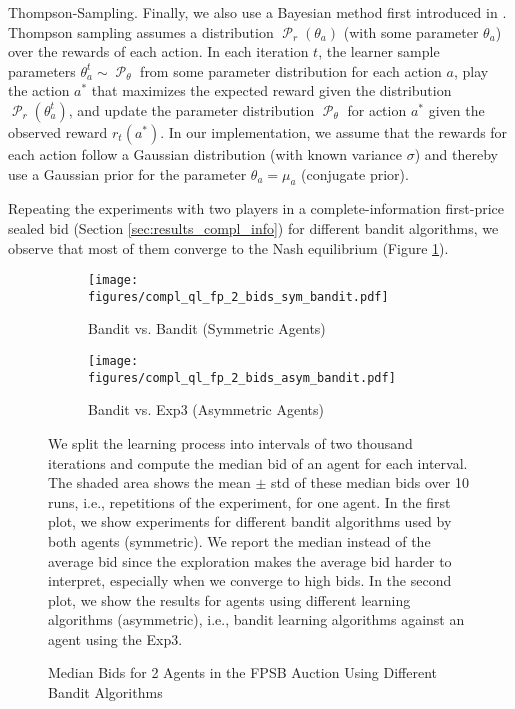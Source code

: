 \documentclass{article}
\DeclareMathOperator{\Pcal}{\mathcal{P}}
\begin{document}
\begin{appendix}
\begin{description}
	\item Thompson-Sampling. Finally, we also use a Bayesian method first introduced in \citep{thompson1933}. Thompson sampling assumes a distribution $\Pcal_r(\theta_a)$ (with some parameter $\theta_a$) over the rewards of each action. In each iteration $t$, the learner sample parameters $\theta_a^t \sim \Pcal_\theta$ from some parameter distribution for each action $a$, play the action $a^*$ that maximizes the expected reward given the distribution $\Pcal_r(\theta_a^t)$, and update the parameter distribution $\Pcal_\theta$ for action $a^*$ given the observed reward $r_t(a^*)$.
	In our implementation, we assume that the rewards for each action follow a Gaussian distribution (with known variance $\sigma$) and thereby use a Gaussian prior for the parameter $\theta_a = \mu_a$ (conjugate prior).
\end{description}
Repeating the experiments with two players in a complete-information first-price sealed bid (Section \ref{sec:results_compl_info}) for different bandit algorithms, we observe that most of them converge to the Nash equilibrium (Figure \ref{fig:bandit}).
\begin{figure}[h]
	\begin{center}
		\begin{subfigure}{0.45\textwidth}
			\centering
			\texttt{[image: figures/compl\_ql\_fp\_2\_bids\_sym\_bandit.pdf]}
			\caption{Bandit vs. Bandit (Symmetric Agents)}
		\end{subfigure}
		\begin{subfigure}{0.45\textwidth}
			\centering
			\texttt{[image: figures/compl\_ql\_fp\_2\_bids\_asym\_bandit.pdf]}
			\caption{Bandit vs. Exp3 (Asymmetric Agents)}
		\end{subfigure}
	\caption{Median Bids for 2 Agents in the FPSB Auction Using Different Bandit Algorithms}
	\label{fig:bandit}
	\end{center}
	\footnotesize
	We split the learning process into intervals of two thousand iterations and compute the median bid of an agent for each interval. The shaded area shows the mean $ \pm $ std of these median bids over 10 runs, i.e., repetitions of the experiment, for one agent. In the first plot, we show experiments for different bandit algorithms used by both agents (symmetric). We report the median instead of the average bid since the exploration makes the average bid harder to interpret, especially when we converge to high bids.
	In the second plot, we show the results for agents using different learning algorithms (asymmetric), i.e., bandit learning algorithms against an agent using the Exp3.
\end{figure}


\end{appendix}
\end{document}
